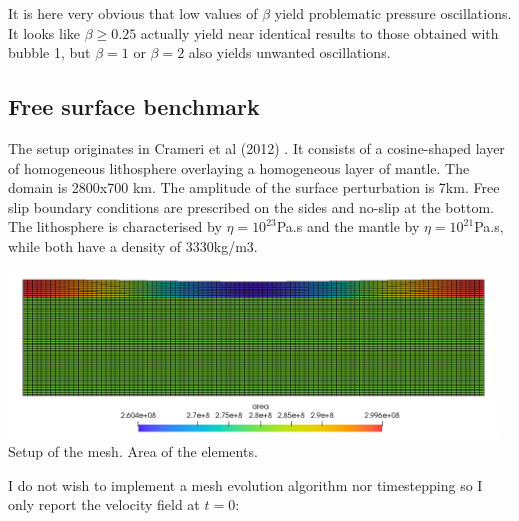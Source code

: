 It is here very obvious that low values of $\beta$ yield problematic pressure oscillations. 
It looks like $\beta \geq 0.25$ actually yield near identical results to those obtained with bubble 1,
but $\beta=1$ or $\beta=2$ also yields unwanted oscillations.

\subsection*{Free surface benchmark}

The setup originates in Crameri et al (2012) \cite{crsg12}. It consists of 
a cosine-shaped layer of homogeneous lithosphere overlaying a homogeneous layer of mantle.
The domain is 2800x700 km. The amplitude of the surface perturbation is 7km. 
Free slip boundary conditions are prescribed on the sides and no-slip at the bottom. 
The lithosphere is characterised by $\eta=10^{23}$Pa.s and the mantle by $\eta=10^{21}$Pa.s, 
while both have a density of 3330kg/m3.

\begin{center}
\includegraphics[width=13cm]{python_codes/fieldstone_72/results/crsg12/area}\\
{\captionfont Setup of the mesh. Area of the elements.}
\end{center}

I do not wish to implement a mesh evolution algorithm nor timestepping so
I only report the velocity field at $t=0$:


